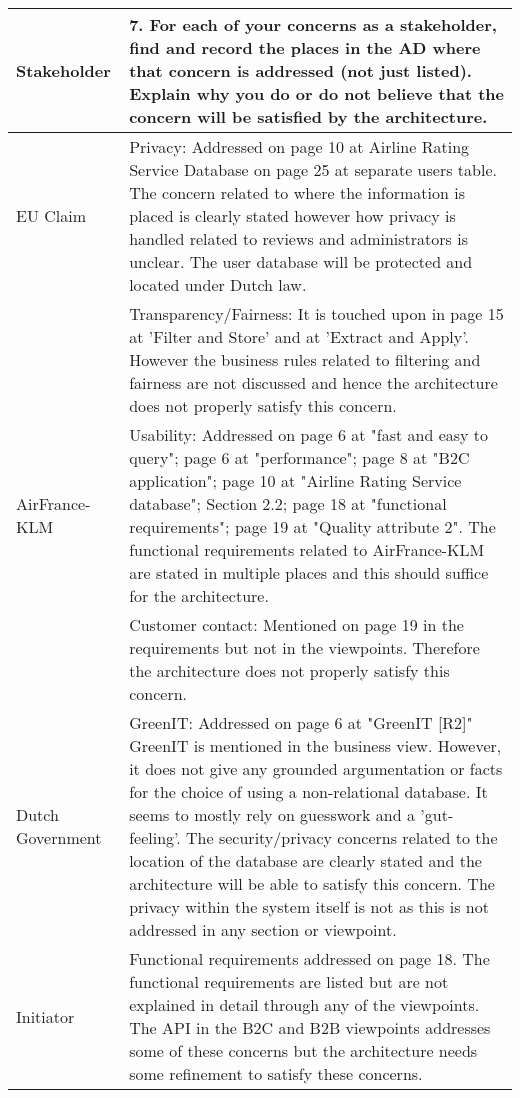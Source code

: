 \begin{longtable}{| l | p{13cm} |}
  \hline
  \textbf{Stakeholder} & \textbf{7. For each of your concerns as a stakeholder, find and record the places in the AD where that concern is addressed (not just listed). Explain why you do or do not believe that the concern will be satisfied by the architecture.} \\
  \hline
  EU Claim & Privacy: Addressed on page 10 at Airline Rating Service Database on page 25 at separate users table. The concern related to where the information is placed is clearly stated however how privacy is handled related to reviews and administrators is unclear. The user database will be protected and located under Dutch law. \\
    & Transparency/Fairness: It is touched upon in page 15 at 'Filter and Store' and at 'Extract and Apply'. However the business rules related to filtering and fairness are not discussed and hence the architecture does not properly satisfy this concern. \\
  \hline
  AirFrance-KLM & Usability: Addressed on page 6 at "fast and easy to query"; page 6 at "performance"; page 8 at "B2C application"; page 10 at "Airline Rating Service database"; Section 2.2;  page 18 at "functional requirements"; page 19 at "Quality attribute 2". \newline
  The functional requirements related to AirFrance-KLM are stated in multiple places and this should suffice for the architecture. \\ 
    & Customer contact: Mentioned on page 19 in the requirements but not in the viewpoints. Therefore the architecture does not properly satisfy this concern. \\
  \hline
  Dutch Government & GreenIT: Addressed on page 6 at "GreenIT [R2]" \newline
  GreenIT is mentioned in the business view. However, it does not give any grounded argumentation or facts for the choice of using a non-relational database. It seems to mostly rely on guesswork and a 'gut-feeling'. The security/privacy concerns related to the location of the database are clearly stated and the architecture will be able to satisfy this concern. The privacy within the system itself is not as this is not addressed in any section or viewpoint. \\
  \hline
  Initiator & Functional requirements addressed on page 18. \newline
  The functional requirements are listed but are not explained in detail through any of the viewpoints. The API in the B2C and B2B viewpoints addresses some of these concerns but the architecture needs some refinement to satisfy these concerns. \\
  \hline


\end{longtable}

